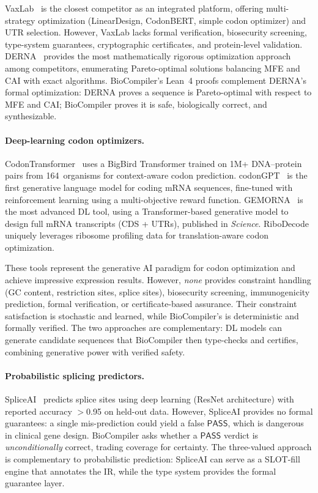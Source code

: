 \documentclass[acmsmall,review,anonymous]{acmart}
\newcommand{\PASS}{\ensuremath{\mathsf{PASS}}\xspace}
\begin{document}
VaxLab~\cite{vaxlab2026} is the closest competitor as an integrated
platform, offering multi-strategy optimization (LinearDesign, CodonBERT,
simple codon optimizer) and UTR selection.  However, VaxLab lacks
formal verification, biosecurity screening, type-system guarantees,
cryptographic certificates, and protein-level validation.
DERNA~\cite{derna2024} provides the most mathematically rigorous
optimization approach among competitors, enumerating Pareto-optimal
solutions balancing MFE and CAI with exact algorithms.  BioCompiler's
Lean~4 proofs complement DERNA's formal optimization: DERNA proves a
sequence is Pareto-optimal with respect to MFE and CAI; BioCompiler
proves it is safe, biologically correct, and synthesizable.

\paragraph{Deep-learning codon optimizers.}
CodonTransformer~\cite{hashemi2025codontransformer} uses a BigBird
Transformer trained on 1M+ DNA--protein pairs from 164~organisms for
context-aware codon prediction.  codonGPT~\cite{codongpt2025} is the
first generative language model for coding mRNA sequences, fine-tuned
with reinforcement learning using a multi-objective reward function.
GEMORNA~\cite{gemorna2025} is the most advanced DL tool, using a
Transformer-based generative model to design full mRNA transcripts
(CDS + UTRs), published in \emph{Science}.  RiboDecode~\cite{ribodecode2025}
uniquely leverages ribosome profiling data for translation-aware codon
optimization.

These tools represent the generative AI paradigm for codon optimization
and achieve impressive expression results.  However, \emph{none}
provides constraint handling (GC content, restriction sites, splice
sites), biosecurity screening, immunogenicity prediction, formal
verification, or certificate-based assurance.  Their constraint
satisfaction is stochastic and learned, while BioCompiler's is
deterministic and formally verified.  The two approaches are
complementary: DL models can generate candidate sequences that
BioCompiler then type-checks and certifies, combining generative power
with verified safety.

\paragraph{Probabilistic splicing predictors.}
SpliceAI~\cite{jaganathan2019spliceai} predicts splice sites using deep
learning (ResNet architecture) with reported accuracy $>$0.95 on held-out
data.  However, SpliceAI provides no formal guarantees: a single
mis-prediction could yield a false \PASS, which is dangerous in clinical
gene design.  BioCompiler asks whether a \PASS{} verdict is
\emph{unconditionally} correct, trading coverage for certainty.  The
three-valued approach is complementary to probabilistic prediction:
SpliceAI can serve as a SLOT-fill engine that annotates the IR, while
the type system provides the formal guarantee layer.
\end{document}
